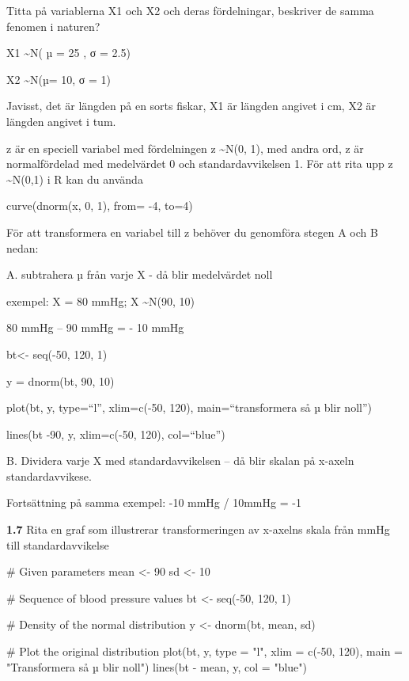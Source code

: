 \documentclass[
  letterpaper,
  DIV=11,
  numbers=noendperiod]{scrartcl}
\newenvironment{Shaded}{\begin{snugshade}}{\end{snugshade}}
\newcommand{\AttributeTok}[1]{\textcolor[rgb]{0.40,0.45,0.13}{#1}}
\newcommand{\CommentTok}[1]{\textcolor[rgb]{0.37,0.37,0.37}{#1}}
\newcommand{\DecValTok}[1]{\textcolor[rgb]{0.68,0.00,0.00}{#1}}
\newcommand{\FunctionTok}[1]{\textcolor[rgb]{0.28,0.35,0.67}{#1}}
\newcommand{\NormalTok}[1]{\textcolor[rgb]{0.00,0.23,0.31}{#1}}
\newcommand{\OtherTok}[1]{\textcolor[rgb]{0.00,0.23,0.31}{#1}}
\newcommand{\SpecialCharTok}[1]{\textcolor[rgb]{0.37,0.37,0.37}{#1}}
\newcommand{\StringTok}[1]{\textcolor[rgb]{0.13,0.47,0.30}{#1}}
\begin{document}
Titta på variablerna X1 och X2 och deras fördelningar, beskriver de
samma fenomen i naturen?

X1 \textasciitilde N( µ = 25 , σ = 2.5)

X2 \textasciitilde N(µ= 10, σ = 1)

Javisst, det är längden på en sorts fiskar, X1 är längden angivet i cm,
X2 är längden angivet i tum.

z är en speciell variabel med fördelningen z \textasciitilde N(0, 1),
med andra ord, z är normalfördelad med medelvärdet 0 och
standardavvikelsen 1. För att rita upp z \textasciitilde N(0,1) i R kan
du använda

curve(dnorm(x, 0, 1), from= -4, to=4)

För att transformera en variabel till z behöver du genomföra stegen A
och B nedan:

A. subtrahera µ från varje X - då blir medelvärdet noll

exempel: X = 80 mmHg; X \textasciitilde N(90, 10)

80 mmHg -- 90 mmHg = - 10 mmHg

bt\textless- seq(-50, 120, 1)

y = dnorm(bt, 90, 10)

plot(bt, y, type=``l'', xlim=c(-50, 120), main=``transformera så µ blir
noll'')

lines(bt -90, y, xlim=c(-50, 120), col=``blue'')

B. Dividera varje X med standardavvikelsen -- då blir skalan på x-axeln
standardavvikese.

Fortsättning på samma exempel: -10 mmHg / 10mmHg = -1

\textbf{1.7} Rita en graf som illustrerar transformeringen av x-axelns
skala från mmHg till standardavvikelse

\begin{Shaded}
\begin{Highlighting}[]
\CommentTok{\# Given parameters}
\NormalTok{mean }\OtherTok{\textless{}{-}} \DecValTok{90}
\NormalTok{sd }\OtherTok{\textless{}{-}} \DecValTok{10}

\CommentTok{\# Sequence of blood pressure values}
\NormalTok{bt }\OtherTok{\textless{}{-}} \FunctionTok{seq}\NormalTok{(}\SpecialCharTok{{-}}\DecValTok{50}\NormalTok{, }\DecValTok{120}\NormalTok{, }\DecValTok{1}\NormalTok{)}

\CommentTok{\# Density of the normal distribution}
\NormalTok{y }\OtherTok{\textless{}{-}} \FunctionTok{dnorm}\NormalTok{(bt, mean, sd)}

\CommentTok{\# Plot the original distribution}
\FunctionTok{plot}\NormalTok{(bt, y, }\AttributeTok{type =} \StringTok{"l"}\NormalTok{, }\AttributeTok{xlim =} \FunctionTok{c}\NormalTok{(}\SpecialCharTok{{-}}\DecValTok{50}\NormalTok{, }\DecValTok{120}\NormalTok{), }\AttributeTok{main =} \StringTok{"Transformera så µ blir noll"}\NormalTok{)}
\FunctionTok{lines}\NormalTok{(bt }\SpecialCharTok{{-}}\NormalTok{ mean, y, }\AttributeTok{col =} \StringTok{"blue"}\NormalTok{)}
\end{Highlighting}
\end{Shaded}
\end{document}
